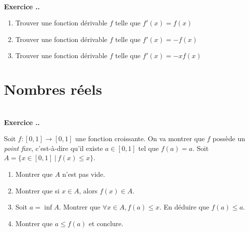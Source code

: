 \documentclass{article}
\newcounter{exo}
\newcommand{\exercice}[1][\null]{\textbf{\\ \large Exercice \thesection.\theexo. \normalsize #1} \addtocounter{exo}{1}}
\begin{document}
\exercice 

\begin{enumerate}
    \item Trouver une fonction dérivable $f$ telle que $f'(x) = f(x)$
    \item Trouver une fonction dérivable $f$ telle que 
        $f'(x) = - f (x)$
    \item Trouver une fonction dérivable $f$ telle que 
        $f'(x) = -x f(x)$
\end{enumerate}

\section{Nombres réels}


\exercice
Soit $f : [0,1] \rightarrow [0,1]$ une fonction croissante. On va montrer que $f$ possède un \emph{point fixe}, c'est-à-dire qu'il existe $a \in [0,1]$ tel que $f(a) = a$. Soit $A = \{x \in [0,1]~|~f(x)\le x\}$.

\begin{enumerate}

\item Montrer que $A$ n'est pas vide.

\item Montrer que si $x \in A$, alors $f(x) \in A$.

\item Soit $a = \inf A$. Montrer que $\forall x \in A, f(a) \le x$. En déduire que $f(a)\le a$.

\item Montrer que $a \le f(a)$ et conclure.

\end{enumerate}
\end{document}
